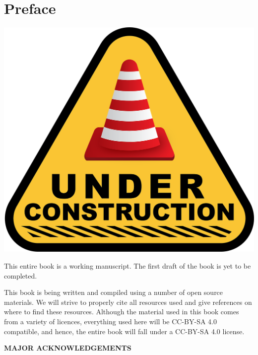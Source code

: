 \chapter*{Preface}


\begin{center}
\href{https://pixabay.com/illustrations/under-construction-construction-sign-2408060/}{\includegraphics[scale = 0.1]{optimization/figures/under-construction-2408060_1280}}
\end{center}

This entire book is a working manuscript.  The first draft of the book is yet to be completed.

This book is being written and compiled using a number of open source materials.   We will  strive to properly cite all resources used and give references on where to find these resources.  Although the material used in this book comes from a variety of licences, everything used here will be CC-BY-SA 4.0 compatible, and hence, the entire book will fall under a CC-BY-SA 4.0 license.


\begin{center}
\fontsize{14pt}{16pt}\selectfont\textcolor{titletextcolour}{\textbf{MAJOR ACKNOWLEDGEMENTS}}
\end{center}


